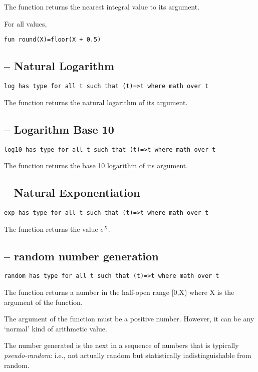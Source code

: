 The  function returns the nearest integral value to its argument. 
\begin{aside}
For all values,
\begin{lstlisting}
fun round(X)=floor(X + 0.5)
\end{lstlisting}
\end{aside}


\subsection{ -- Natural Logarithm}
\begin{lstlisting}
log has type for all t such that (t)=>t where math over t
\end{lstlisting}

The  function returns the natural logarithm of its argument.

\subsection{ -- Logarithm Base 10}
\begin{lstlisting}
log10 has type for all t such that (t)=>t where math over t
\end{lstlisting}

The  function returns the base 10 logarithm of its argument.


\subsection{ -- Natural Exponentiation}
\begin{lstlisting}
exp has type for all t such that (t)=>t where math over t
\end{lstlisting}

The  function returns the value $e^X$.

\subsection{ -- random number generation}
\begin{lstlisting}
random has type for all t such that (t)=>t where math over t
\end{lstlisting}

The  function returns a number in the half-open range [0,X) where X is the argument of the function.
\begin{aside}
The argument of the  function must be a positive number. However, it can be any `normal' kind of arithmetic value.
\end{aside}
The number generated is the next in a sequence of numbers that is typically \emph{pseudo-random}: i.e., not actually random but statistically indistinguishable from random.

